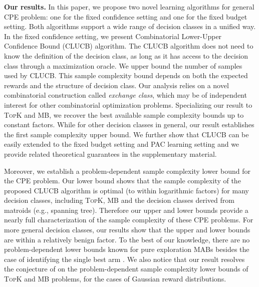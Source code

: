 \documentclass{article}
\newcommand{\Algorithm}{{\small \textsf{CLUCB}}\xspace}
\newcommand{\Problem}{{CPE}\xspace}
\newcommand{\MultiIdent}{\textsc{TopK}\xspace}
\newcommand{\MultiBandit}{\textsc{MB}\xspace}
\begin{document}
\textbf{Our results.}
In this paper, we propose two novel learning algorithms for general \Problem problem: one for the fixed confidence setting and one for the fixed budget setting.
Both algorithms support a wide range of decision classes in a unified way. 
In the fixed confidence setting, we present Combinatorial Lower-Upper Confidence Bound (\Algorithm) algorithm.
The \Algorithm algorithm does not need to know the definition of the decision class, as long as it has access to the decision class through a maximization oracle.
We upper bound the number of samples used by \Algorithm. 
This sample complexity bound depends on both the expected rewards and the structure of decision class. 
Our analysis relies on a novel combinatorial construction called \emph{exchange class}, which may be of independent interest for other combinatorial optimization problems. 
Specializing our result  to \MultiIdent and \MultiBandit, we recover the best available sample complexity bounds \citep{kalyanakrishnan2012pac,gabillon2012best,kaufmann2013information} up to constant factors.
While for other decision classes in general, our result establishes the first sample complexity upper bound. 
We further show that \Algorithm can be easily extended to the fixed budget setting and PAC learning setting and we provide related theoretical guarantees in the supplementary material.  

Moreover, we establish a problem-dependent sample complexity lower bound for the \Problem problem.  
Our lower bound shows that the sample complexity of the proposed \Algorithm algorithm is optimal (to within logarithmic factors) for many  decision classes, including \MultiIdent, \MultiBandit and the decision classes derived from matroids (e.g., spanning tree). 
Therefore our upper and lower bounds  provide a nearly full characterization of the sample complexity of these \Problem problems. 
For more general decision classes, our results show that the upper and lower bounds are within a relatively benign factor. 
To the best of our knowledge, there are no problem-dependent lower bounds known for pure exploration MABs besides the case of identifying the single best arm \citep{mannor2004sample,audibert2010best}.
We also notice that our result resolves the conjecture of \citet{bubeck2013multiple} on the problem-dependent sample complexity lower bounds of \MultiIdent and \MultiBandit problems, for the cases of Gaussian reward distributions.
\end{document}
